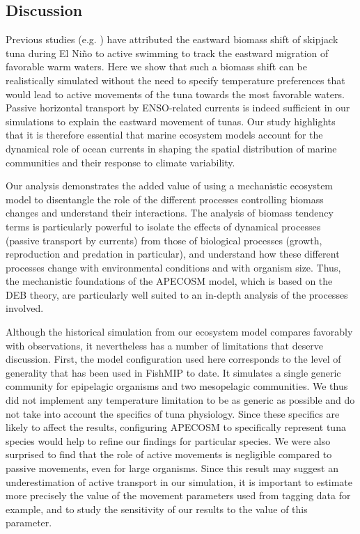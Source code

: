\subsection{Discussion}

Previous studies (e.g. \citealp{lehodeyNinoSouthernOscillation1997, lehodeyPelagicEcosystemTropical2001}) have attributed the eastward biomass shift of skipjack tuna during El Niño to active swimming to track the eastward migration of favorable warm waters. Here we show that such a biomass shift can be realistically simulated without the need to specify temperature preferences that would lead to active movements of the tuna towards the most favorable waters. Passive horizontal transport by ENSO-related currents is indeed sufficient in our simulations to explain the eastward movement of tunas. Our study highlights that it is therefore essential that marine ecosystem models account for the dynamical role of ocean currents in shaping the spatial distribution of marine communities and their response to climate variability.

Our analysis demonstrates the added value of using a mechanistic ecosystem model to disentangle the role of the different processes controlling biomass changes and understand their interactions. The analysis of biomass tendency terms is particularly powerful to isolate the effects of dynamical processes (passive transport by currents) from those of biological processes (growth, reproduction and predation in particular), and understand how these different processes change with environmental conditions and with organism size. Thus, the mechanistic foundations of the APECOSM model, which is based on the DEB theory, are particularly well suited to an in-depth analysis of the processes involved.

Although the historical simulation from our ecosystem model compares favorably with observations, it nevertheless has a number of limitations that deserve discussion. First, the model configuration used here corresponds to the level of generality that has been used in FishMIP to date. It simulates a single generic community for epipelagic organisms and two mesopelagic communities. We thus did not implement any temperature limitation to be as generic as possible and do not take into account the specifics of tuna physiology. Since these specifics are likely to affect the results, configuring APECOSM to specifically represent tuna species would help to refine our findings for particular species. We were also surprised to find that the role of active movements is negligible compared to passive movements, even for large organisms. Since this result may suggest an underestimation of active transport in our simulation, it is important to estimate more precisely the value of the movement parameters used from tagging data for example, and to study the sensitivity of our results to the value of this parameter.


